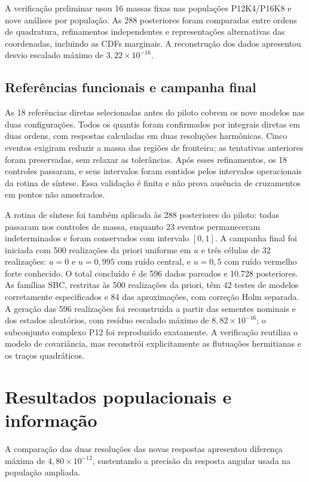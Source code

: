 A verificação preliminar usou 16 massas fixas nas populações P12K4/P16K8 e nove análises por população. As 288 posteriores foram comparadas entre ordens de quadratura, refinamentos independentes e representações alternativas das coordenadas, incluindo as CDFs marginais. A reconstrução dos dados apresentou desvio escalado máximo de $3{,}22\times10^{-16}$.


\subsection{Referências funcionais e campanha final}

As 18 referências diretas selecionadas antes do piloto cobrem os nove modelos nas duas configurações. Todos os quantis foram confirmados por integrais diretas em duas ordens, com respostas calculadas em duas resoluções harmônicas. Cinco eventos exigiram reduzir a massa das regiões de fronteira; as tentativas anteriores foram preservadas, sem relaxar as tolerâncias. Após esses refinamentos, os 18 controles passaram, e seus intervalos foram contidos pelos intervalos operacionais da rotina de síntese. Essa validação é finita e não prova ausência de cruzamentos em pontos não amostrados.

A rotina de síntese foi também aplicada às 288 posteriores do piloto: todas passaram nos controles de massa, enquanto 23 eventos permaneceram indeterminados e foram conservados com intervalo $[0,1]$. A campanha final foi iniciada com 500 realizações da priori uniforme em $u$ e três células de 32 realizações: $u=0$ e $u=0{,}995$ com ruído central, e $u=0{,}5$ com ruído vermelho forte conhecido. O total concluído é de 596 dados pareados e 10.728 posteriores. As famílias SBC, restritas às 500 realizações da priori, têm 42 testes de modelos corretamente especificados e 84 das aproximações, com correção Holm separada. A geração das 596 realizações foi reconstruída a partir das sementes nominais e dos estados aleatórios, com resíduo escalado máximo de $8{,}82\times10^{-16}$; o subconjunto complexo P12 foi reproduzido exatamente. A verificação reutiliza o modelo de covariância, mas reconstrói explicitamente as flutuações hermitianas e os traços quadráticos.

\section{Resultados populacionais e informação}

A comparação das duas resoluções das novas respostas apresentou diferença máxima de $4{,}80\times10^{-12}$, sustentando a precisão da resposta angular usada na população ampliada.

